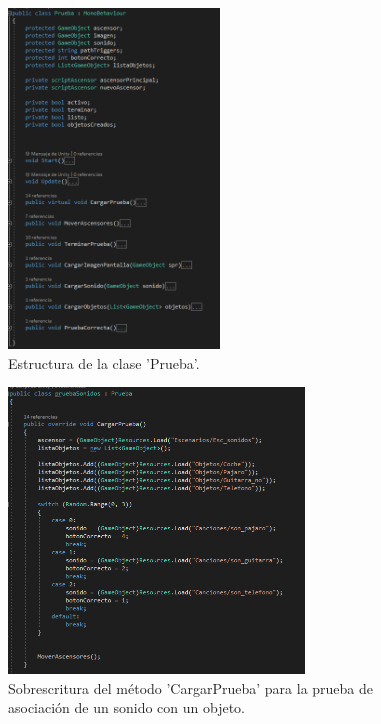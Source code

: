 \begin{figure}
  \centering
    \includegraphics[width=0.5\textwidth]{04.Desarrollo/04.Entrega4/02.Iteracion4_2/00.Figuras/01.prueba.png}
    \caption{Estructura de la clase 'Prueba'.}
    \label{fig:E4_clasePrueba}
\end{figure}

\begin{figure}
  \centering
    \includegraphics[width=0.7\textwidth]{04.Desarrollo/04.Entrega4/02.Iteracion4_2/00.Figuras/02.cargar_prueba.png}
    \caption{Sobrescritura del método 'CargarPrueba' para la prueba de asociación de un sonido con un objeto.}
    \label{fig:E4_cargarPrueba}
\end{figure}




